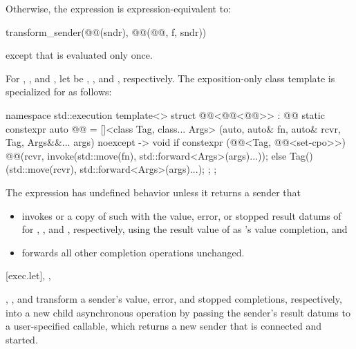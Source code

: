 \pnum
Otherwise,
the expression  is expression-equivalent to:
\begin{codeblock}
transform_sender(@@(sndr), @@(@@, f, sndr))
\end{codeblock}
except that  is evaluated only once.

\pnum
For , , and ,
let  be
, , and , respectively.
The exposition-only class template 
is specialized for  as follows:
\begin{codeblock}
namespace std::execution {
  template<>
  struct @@<@@<@@>> : @@ {
    static constexpr auto @@ =
      []<class Tag, class... Args>
        (auto, auto& fn, auto& rcvr, Tag, Args&&... args) noexcept -> void {
          if constexpr (@@<Tag, @@<set-cpo>>) {
            @@(rcvr,
                          invoke(std::move(fn), std::forward<Args>(args)...));
          } else {
            Tag()(std::move(rcvr), std::forward<Args>(args)...);
          }
        };
  };
}
\end{codeblock}

\pnum
The expression  has undefined behavior
unless it returns a sender  that
\begin{itemize}
\item
invokes  or a copy of such
with the value, error, or stopped result datums of 
for , , and , respectively,
using the result value of  as 's value completion, and
\item
forwards all other completion operations unchanged.
\end{itemize}

[exec.let]{, , }

\pnum
{}, , and  transform
a sender's value, error, and stopped completions, respectively,
into a new child asynchronous operation
by passing the sender's result datums to a user-specified callable,
which returns a new sender that is connected and started.

